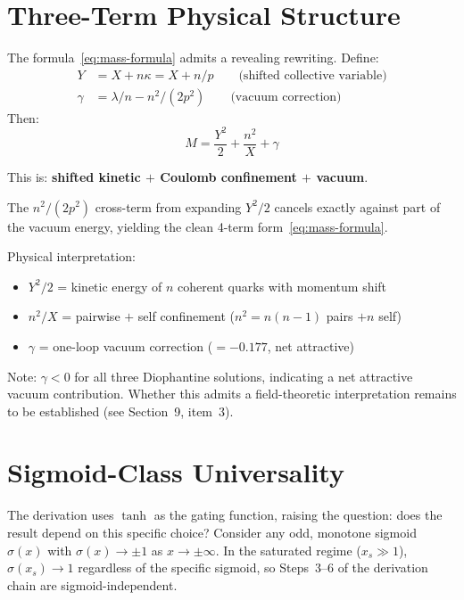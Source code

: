 \documentclass[12pt,a4paper]{article}
\theoremstyle{definition}
\begin{document}
\section{Three-Term Physical Structure}

The formula~\eqref{eq:mass-formula} admits a revealing rewriting. Define:
\begin{align*}
  Y &= X + n\kappa = X + n/p \qquad\text{(shifted collective variable)} \\
  \gamma &= \lambda/n - n^2/(2p^2) \qquad\text{(vacuum correction)}
\end{align*}
Then:
\begin{equation}\label{eq:three-term}
  M = \frac{Y^2}{2} + \frac{n^2}{X} + \gamma
\end{equation}

This is: \textbf{shifted kinetic $+$ Coulomb confinement $+$ vacuum}.

The $n^2/(2p^2)$ cross-term from expanding $Y^2/2$ cancels exactly against
part of the vacuum energy, yielding the clean 4-term form~\eqref{eq:mass-formula}.

Physical interpretation:
\begin{itemize}
  \item $Y^2/2$ = kinetic energy of $n$ coherent quarks with momentum shift
  \item $n^2/X$ = pairwise $+$ self confinement ($n^2 = n(n-1)$ pairs $+ n$ self)
  \item $\gamma$ = one-loop vacuum correction ($= -0.177$, net attractive)
\end{itemize}

Note: $\gamma < 0$ for all three Diophantine solutions, indicating a
net attractive vacuum contribution. Whether this admits a field-theoretic
interpretation remains to be established (see Section~9, item~3).

\section{Sigmoid-Class Universality}

The derivation uses $\tanh$ as the gating function, raising the question:
does the result depend on this specific choice? Consider any odd, monotone
sigmoid $\sigma(x)$ with $\sigma(x) \to \pm 1$ as $x \to \pm\infty$. In the
saturated regime ($x_s \gg 1$), $\sigma(x_s) \to 1$ regardless of the
specific sigmoid, so Steps~3--6 of the derivation chain are
sigmoid-independent.
\end{document}
